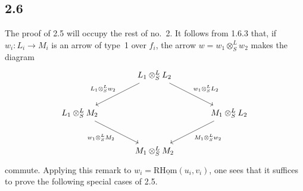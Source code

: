 \subsection*{2.6}
The proof of 2.5 will occupy the rest of no.~2. It follows from 1.6.3 that, if $w_i:L_i\to M_i$ is an arrow of type~1 over $f_i$, the arrow $w=w_1\otimes^{L}_{S}w_2$ makes the diagram
\[
\begin{tikzcd}[column sep=large,row sep=large]
& L_1\otimes^L_S L_2 \arrow[dl,"{L_1\otimes^L_S w_2}"'] \arrow[dr,"{w_1\otimes^L_S L_2}"] & \\
L_1\otimes^L_S M_2 \arrow[dr,"{w_1\otimes^L_S M_2}"'] & & M_1\otimes^L_S L_2 \arrow[dl,"{M_1\otimes^L_S w_2}"]\\
& M_1\otimes^L_S M_2 &
\end{tikzcd}
\]
commute. Applying this remark to $w_i=\mathrm{R}\underline{\mathrm{Hom}}(u_i,v_i)$, one sees that it suffices to prove the following special cases of 2.5.

